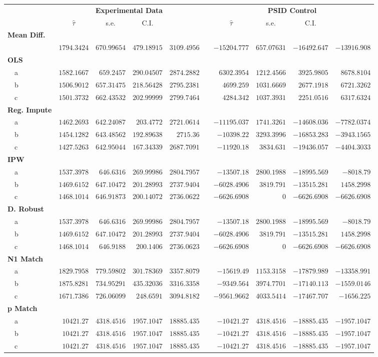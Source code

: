 \begin{tabular}{lrrrrcrrrr}
\hline\hline
\multicolumn{1}{l}{\bfseries }&\multicolumn{4}{c}{\bfseries Experimental Data}&\multicolumn{1}{c}{\bfseries }&\multicolumn{4}{c}{\bfseries PSID Control}\tabularnewline
\cline{2-5} \cline{7-10}
\multicolumn{1}{l}{}&\multicolumn{1}{c}{$\hat{\tau}$}&\multicolumn{1}{c}{s.e.}&\multicolumn{1}{c}{C.I.}&\multicolumn{1}{c}{}&\multicolumn{1}{c}{}&\multicolumn{1}{c}{$\hat{\tau}$}&\multicolumn{1}{c}{s.e.}&\multicolumn{1}{c}{C.I.}&\multicolumn{1}{c}{}\tabularnewline
\hline
{\bfseries Mean Diff.}&&&&&&&&&\tabularnewline
 ~~&$1794.3424$&$670.99654$&$479.18915$&$3109.4956$&&$  -15204.777$&$ 657.07631$&$-16492.647$&$-13916.908 $\tabularnewline
 \hline
 {\bfseries OLS}&&&&&&&&&\tabularnewline
 ~~a&$1582.1667$&$ 659.2457$&$290.04507$&$2874.2882$&&$  6302.3954$&$ 1212.4566$&$ 3925.9805$&$ 8678.8104$  \tabularnewline
 ~~b&$1506.9012$&$657.31475$&$218.56428$&$2795.2381$&&$  4699.259$&$ 1031.6669$&$ 2677.1918$&$ 6721.3262$  \tabularnewline
 ~~c&$1501.3732$&$662.43532$&$202.99999$&$2799.7464 $&&$ 4284.342$&$ 1037.3931$&$ 2251.0516$&$ 6317.6324$  \tabularnewline
 \hline
 {\bfseries Reg. Impute}&&&&&&&&&\tabularnewline
 ~~a&$1462.2693$&$642.24087$&$ 203.4772$&$2721.0614$&&$  -11195.037$&$ 1741.3261$&$-14608.036$&$-7782.0374$  \tabularnewline
 ~~b&$1454.1282$&$643.48562$&$192.89638$&$2715.36$&&$ -10398.22$&$ 3293.3996$&$-16853.283$&$-3943.1565$  \tabularnewline
 ~~c&$1427.5263$&$642.95044$&$167.34339$&$2687.7091$&&$-11920.18$&$3834.631$&$-19436.057$&$-4404.3033$  \tabularnewline
 \hline
 {\bfseries IPW}&&&&&&&&&\tabularnewline
 ~~a&$1537.3978$&$ 646.6316$&$269.99986$&$2804.7957$&&$-13507.18$&$ 2800.1988$&$-18995.569$&$-8018.79$  \tabularnewline
 ~~b&$1469.6152$&$647.10472$&$201.28993$&$2737.9404$&&$-6028.4906$&$3819.791$&$-13515.281$&$ 1458.2998$  \tabularnewline
~~c&$1468.1014$&$646.91873$&$200.14072$&$2736.0622$&&$-6626.6908$&$ 0$&$-6626.6908$&$-6626.6908$  \tabularnewline
\hline
{\bfseries D. Robust}&&&&&&&&&\tabularnewline
~~a&$1537.3978$&$ 646.6316$&$269.99986$&$2804.7957$&&$-13507.18$&$ 2800.1988$&$-18995.569$&$-8018.79$  \tabularnewline
~~b&$1469.6152$&$647.10472$&$201.28993$&$2737.9404$&&$-6028.4906$&$3819.791$&$-13515.281$&$ 1458.2998$  \tabularnewline
~~c&$1468.1014$&$ 646.9188$&$ 200.1406$&$2736.0623$&&$-6626.6908$&$ 0$&$-6626.6908$&$-6626.6908$  \tabularnewline
\hline
{\bfseries N1 Match}&&&&&&&&&\tabularnewline
~~a&$1829.7958$&$779.59802$&$301.78369$&$3357.8079$&&$-15619.49$&$ 1153.3158$&$-17879.989$&$-13358.991$  \tabularnewline
~~b&$1875.8281$&$734.95291$&$435.32036$&$3316.3358$&&$-9349.564$&$ 3974.7701$&$-17140.113$&$-1559.0146$  \tabularnewline
~~c&$1671.7386$&$726.06099$&$ 248.6591$&$3094.8182$&&$-9561.9662$&$ 4033.5414$&$-17467.707$&$ -1656.225$  \tabularnewline
\hline
{\bfseries p Match}&&&&&&&&&\tabularnewline
~~a&$ 10421.27$&$4318.4516$&$1957.1047$&$18885.435$&&$-10421.27$&$ 4318.4516$&$-18885.435$&$-1957.1047$  \tabularnewline
~~b&$ 10421.27$&$4318.4516$&$1957.1047$&$18885.435$&&$-10421.27$&$ 4318.4516$&$-18885.435$&$-1957.1047$  \tabularnewline
~~c&$ 10421.27$&$4318.4516$&$1957.1047$&$18885.435$&&$-10421.27$&$ 4318.4516$&$-18885.435$&$-1957.1047$  \tabularnewline
\hline
\end{tabular}






